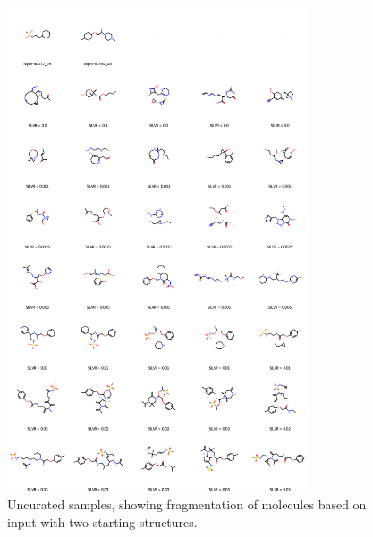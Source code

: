 \documentclass[journal=jacsat,manuscript=article]{achemso}
\begin{document}
\begin{suppinfo}
\begin{figure}
    \centering
    \includegraphics[width=0.8\textwidth]{paper/Figures/FigS5/mols_grid_silvr_rate_not_curated.png}
    \caption{Uncurated samples, showing fragmentation of molecules based on input with two starting structures.}
    \label{fig:uncurated_sample}
\end{figure}

\end{suppinfo}
\end{document}
